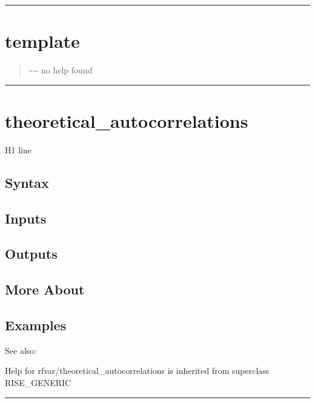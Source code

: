 \documentclass[letterpaper,10pt,english]{sphinxmanual}
\begin{document}
\bigskip\hrule{}\bigskip



\section{template}
\label{classes/models/@rfvar/rfvar:id152}\label{classes/models/@rfvar/rfvar:template}\begin{quote}

\textasciitilde{}\textasciitilde{} no help found
\end{quote}


\bigskip\hrule{}\bigskip



\section{theoretical\_autocorrelations}
\label{classes/models/@rfvar/rfvar:theoretical-autocorrelations}\label{classes/models/@rfvar/rfvar:id153}
H1 line


\subsection{Syntax}
\label{classes/models/@rfvar/rfvar:id154}

\subsection{Inputs}
\label{classes/models/@rfvar/rfvar:id155}

\subsection{Outputs}
\label{classes/models/@rfvar/rfvar:id156}

\subsection{More About}
\label{classes/models/@rfvar/rfvar:id157}

\subsection{Examples}
\label{classes/models/@rfvar/rfvar:id158}
See also:

Help for rfvar/theoretical\_autocorrelations is inherited from superclass RISE\_GENERIC


\bigskip\hrule{}\bigskip
\end{document}

